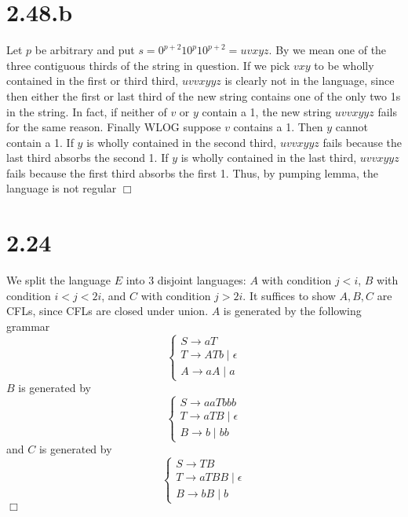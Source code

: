 \documentclass{article}
\begin{document}
\section*{2.48.b}
Let $p$ be arbitrary and put $s = 0^{p+2}10^p10^{p+2} = uvxyz$. By  we mean one of the three contiguous thirds of the string in question. If we pick $vxy$ to be wholly contained in the first or third third, $uvvxyyz$ is clearly not in the language, since then either the first or last third of the new string contains one of the only two 1s in the string. In fact, if neither of $v$ or $y$ contain a 1, the new string $uvvxyyz$ fails for the same reason. Finally WLOG suppose $v$ contains a 1. Then $y$ cannot contain a 1. If $y$ is wholly contained in the second third, $uvvxyyz$ fails because the last third absorbs the second 1. If $y$ is wholly contained in the last third, $uvvxyyz$ fails because the first third absorbs the first 1. Thus, by pumping lemma, the language is not regular $\Box$

\section*{2.24}
We split the language $E$ into 3 disjoint languages: $A$ with condition $j < i$, $B$ with condition $i < j < 2i$, and $C$ with condition $j > 2i$. It suffices to show $A,B,C$ are CFLs, since CFLs are closed under union. $A$ is generated by the following grammar
\begin{equation*}
\begin{cases}
S \to aT\\
T \to ATb \;|\; \epsilon\\
A \to aA \;|\; a
\end{cases}
\end{equation*}
$B$ is generated by
\begin{equation*}
\begin{cases}
S \to aaTbbb\\
T \to aTB \;|\; \epsilon\\
B \to b \;|\; bb
\end{cases}
\end{equation*}
and $C$ is generated by
\begin{equation*}
\begin{cases}
S \to TB\\
T \to aTBB \;|\; \epsilon\\
B \to bB \;|\; b
\end{cases}
\end{equation*}
$\Box$
\end{document}
